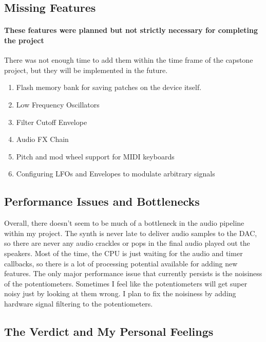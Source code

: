 \documentclass[acmlarge,screen]{acmart}
\begin{document}
	\subsection{Missing Features}
	\paragraph{These features were planned but not strictly necessary for completing the project} There was not enough time to add them within the time frame of the capstone project, but they will be implemented in the future.
	\begin{enumerate}
		\item Flash memory bank for saving patches on the device itself.
		\item Low Frequency Oscillators
		\item Filter Cutoff Envelope
		\item Audio FX Chain
		\item Pitch and mod wheel support for MIDI keyboards
		\item Configuring LFOs and Envelopes to modulate arbitrary signals
	\end{enumerate}
		
	\subsection{Performance Issues and Bottlenecks}
	Overall, there doesn't seem to be much of a bottleneck in the audio pipeline within my project. The synth is never late to deliver audio samples to the DAC, so there are never any audio crackles or pops in the final audio played out the speakers. Most of the time, the CPU is just waiting for the audio and timer callbacks, so there is a lot of processing potential available for adding new features. The only major performance issue that currently persists is the noisiness of the potentiometers. Sometimes I feel like the potentiometers will get super noisy just by looking at them wrong. I plan to fix the noisiness by adding hardware signal filtering to the potentiometers.
	
	\subsection{The Verdict and My Personal Feelings}
\end{document}
